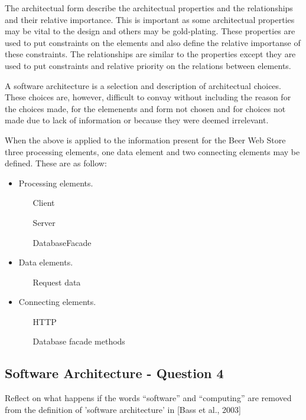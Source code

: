 The architectual form describe the architectual properties and the relationships and their relative importance. This is important as some architectual properties
may be vital to the design and others may be gold-plating. These properties are used to put constraints on the elements and also define the relative importanse of these constraints. The relationships are similar to the properties except they are used to put constraints and relative priority on the relations between elements.

A software architecture is a selection and description of architectual choices. These choices are, however, difficult to convay without including the reason for the choices made, for the elemenents and form not chosen and for choices not made due to lack of information or because they were deemed irrelevant.

When the above is applied to the information present for the Beer Web Store three processing elements, one data element and two connecting elements may be defined. These are as follow:

\begin{itemize}
    \item Processing elements.
	 \begin{itemize}
	    \item[Client]
	    \item[Server]
	    \item[DatabaseFacade]
	 \end{itemize}
    \item Data elements.
	 \begin{itemize}
	    \item[Request data]
	 \end{itemize}
    \item Connecting elements.
	 \begin{itemize}
	    \item[HTTP]
	    \item[Database facade methods]
	 \end{itemize}
\end{itemize}




\subsection{Software Architecture - Question 4}

\begin{question}
Reflect on what happens if the words ``software'' and
``computing'' are removed from the definition of 'software
architecture' in [Bass et al., 2003]
\end{question}

